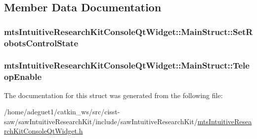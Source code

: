 \subsection{Member Data Documentation}
\hypertarget{structmts_intuitive_research_kit_console_qt_widget_1_1_main_struct_a85aa4b393edb269c840118151566d905}{
\subsubsection[{Set\-Robots\-Control\-State}]{ mts\-Intuitive\-Research\-Kit\-Console\-Qt\-Widget\-::\-Main\-Struct\-::\-Set\-Robots\-Control\-State}}\label{structmts_intuitive_research_kit_console_qt_widget_1_1_main_struct_a85aa4b393edb269c840118151566d905}
\hypertarget{structmts_intuitive_research_kit_console_qt_widget_1_1_main_struct_ae4f56798ee1b99c826165cacd67d0ef3}{
\subsubsection[{Teleop\-Enable}]{ mts\-Intuitive\-Research\-Kit\-Console\-Qt\-Widget\-::\-Main\-Struct\-::\-Teleop\-Enable}}\label{structmts_intuitive_research_kit_console_qt_widget_1_1_main_struct_ae4f56798ee1b99c826165cacd67d0ef3}


The documentation for this struct was generated from the following file\-:\begin{DoxyCompactItemize}
\item 
/home/adeguet1/catkin\-\_\-ws/src/cisst-\/saw/saw\-Intuitive\-Research\-Kit/include/saw\-Intuitive\-Research\-Kit/\hyperlink{mts_intuitive_research_kit_console_qt_widget_8h}{mts\-Intuitive\-Research\-Kit\-Console\-Qt\-Widget.\-h}\end{DoxyCompactItemize}
